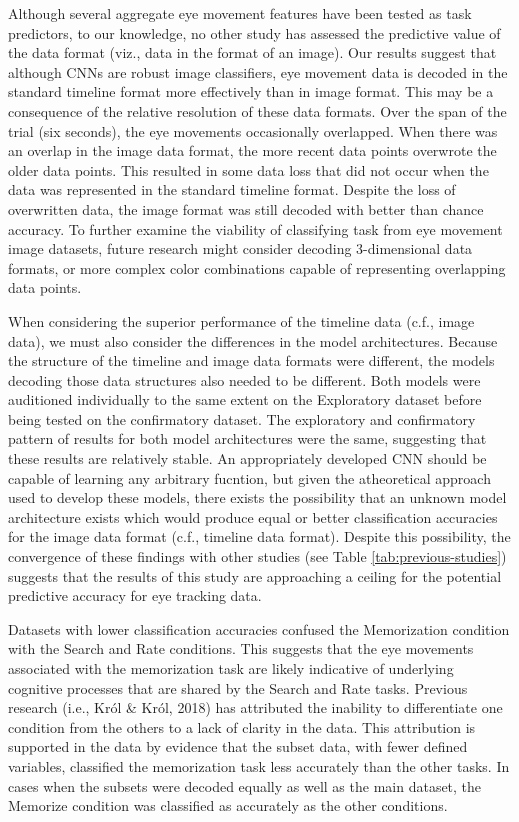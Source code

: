 \documentclass[
  english,
  man,floatsintext]{apa6}
\begin{document}
Although several aggregate eye movement features have been tested as task predictors, to our knowledge, no other study has assessed the predictive value of the data format (viz., data in the format of an image). Our results suggest that although CNNs are robust image classifiers, eye movement data is decoded in the standard timeline format more effectively than in image format. This may be a consequence of the relative resolution of these data formats. Over the span of the trial (six seconds), the eye movements occasionally overlapped. When there was an overlap in the image data format, the more recent data points overwrote the older data points. This resulted in some data loss that did not occur when the data was represented in the standard timeline format. Despite the loss of overwritten data, the image format was still decoded with better than chance accuracy. To further examine the viability of classifying task from eye movement image datasets, future research might consider decoding 3-dimensional data formats, or more complex color combinations capable of representing overlapping data points.

When considering the superior performance of the timeline data (c.f., image data), we must also consider the differences in the model architectures. Because the structure of the timeline and image data formats were different, the models decoding those data structures also needed to be different. Both models were auditioned individually to the same extent on the Exploratory dataset before being tested on the confirmatory dataset. The exploratory and confirmatory pattern of results for both model architectures were the same, suggesting that these results are relatively stable. An appropriately developed CNN should be capable of learning any arbitrary fucntion, but given the atheoretical approach used to develop these models, there exists the possibility that an unknown model architecture exists which would produce equal or better classification accuracies for the image data format (c.f., timeline data format). Despite this possibility, the convergence of these findings with other studies (see Table \ref{tab:previous-studies}) suggests that the results of this study are approaching a ceiling for the potential predictive accuracy for eye tracking data.

Datasets with lower classification accuracies confused the Memorization condition with the Search and Rate conditions. This suggests that the eye movements associated with the memorization task are likely indicative of underlying cognitive processes that are shared by the Search and Rate tasks. Previous research (i.e., Król \& Król, 2018) has attributed the inability to differentiate one condition from the others to a lack of clarity in the data. This attribution is supported in the data by evidence that the subset data, with fewer defined variables, classified the memorization task less accurately than the other tasks. In cases when the subsets were decoded equally as well as the main dataset, the Memorize condition was classified as accurately as the other conditions.
\end{document}
